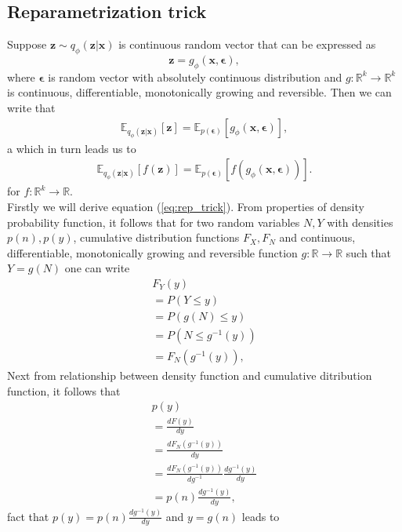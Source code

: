 \documentclass[10pt]{article}
\begin{document}
\subsection{Reparametrization trick}
Suppose $\textbf{z} \sim q_{\phi }(\textbf{z}|\textbf{x})$ is continuous random vector that can be expressed as 
\begin{equation} \label{eq:z_form}
    \textbf{z} = g_{ \phi}(\textbf{x}, \bm{\epsilon} ),
\end{equation}
where  $\bm{\epsilon}$ is random vector with absolutely continuous distribution  and 
$g: \mathbb{R}^{k} \to \mathbb{R}^{k}$ is continuous, differentiable, monotonically growing and reversible. Then we can write that
\begin{gather} \label{eq:rep_trick}
    \mathbb{E}_{q_{\phi }(\textbf{z}|\textbf{x})} [\textbf{z} ]
    = \mathbb{E}_{p(\bm{\epsilon})}[g_{ \phi}(\textbf{x}, \bm{\epsilon} )],
\end{gather}
a which in turn leads us to
\begin{gather} \label{eq:rep_trick_nested}
    \mathbb{E}_{q_{\phi }(\textbf{z}|\textbf{x})} [ f(\textbf{z}) ]
    = \mathbb{E}_{p(\bm{\epsilon})}[f( g_{ \phi}(\textbf{x}, \bm{\epsilon} ) )].
\end{gather}
for  $f: \mathbb{R}^{k} \to \mathbb{R}$.\\

Firstly we will derive equation (\ref{eq:rep_trick}).
From properties of density probability function, it follows that for two random variables $N, Y $ with densities $p(n), p(y) $, cumulative distribution functions $F_X, F_N$ and continuous, differentiable, monotonically growing and reversible function  $ g: \mathbb{R} \to \mathbb{R}$ such that $Y = g(N)$ one can write 
\begin{gather}
   F_Y(y) \\
   = P(Y \leq y)\\
   = P( g(N) \leq y)\\
   = P( N \leq g^{-1}(y) )\\
   = F_{N}(g^{-1}(y)),
\end{gather}
Next from relationship between density function and cumulative ditribution function, it follows that
\begin{gather}
    p(y) \\
    = \frac{dF(y)}{dy}\\
    = \frac{ dF_{N}(g^{-1}(y)) }{dy}\\
    =  \frac{ dF_{N}(g^{-1}(y)) }{dg^{-1}} \frac{dg^{-1}(y)}{dy}\\
    = p(n)\frac{dg^{-1}(y)}{dy},
\end{gather}
fact that $ p(y) =  p(n)\frac{dg^{-1}(y)}{dy}$ and $y = g(n)$ leads to
\end{document}
